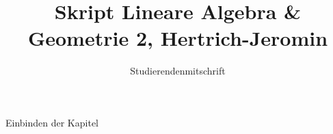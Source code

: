 \documentclass[a4paper, 11pt, DIV=12]{scrreprt}
\author{Studierendenmitschrift}
\title{Skript Lineare Algebra \& Geometrie 2, Hertrich-Jeromin}
\begin{document}
\maketitle
\tableofcontents
 Einbinden der Kapitel












\printindex
\end{document}
